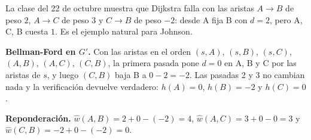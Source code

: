 \documentclass[11pt,letterpaper]{article}
\begin{document}
\begin{ejemplo}
  \label{ej:johnson-libreta}
  La clase del 22 de octubre muestra que Dijkstra falla con las
  aristas $A \to B$ de peso $2$, $A \to C$ de peso $3$ y $C \to B$ de
  peso $-2$: desde A fija B con $d = 2$, pero A, C, B cuesta $1$. Es
  el ejemplo natural para Johnson.

  \textbf{Bellman-Ford en $G'$.} Con las aristas en el orden
  $(s, A)$, $(s, B)$, $(s, C)$, $(A, B)$, $(A, C)$, $(C, B)$, la
  primera pasada pone $d = 0$ en A, B y C por las aristas de $s$, y
  luego $(C, B)$ baja B a $0 - 2 = -2$. Las pasadas 2 y 3 no cambian
  nada y la verificación devuelve verdadero: $h(A) = 0$, $h(B) = -2$
  y $h(C) = 0$.

  \textbf{Reponderación.} $\hat{w}(A, B) = 2 + 0 - (-2) = 4$,
  $\hat{w}(A, C) = 3 + 0 - 0 = 3$ y
  $\hat{w}(C, B) = -2 + 0 - (-2) = 0$.


\end{ejemplo}
\end{document}
